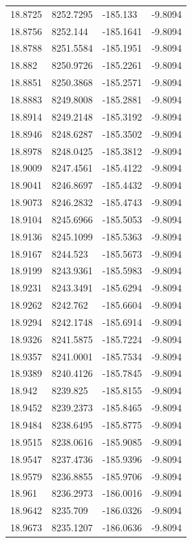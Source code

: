 \begin{table}[H]
\begin{tabular}{llll}
18.8725 & 8252.7295 & -185.133 & -9.8094 \\
18.8756 & 8252.144 & -185.1641 & -9.8094 \\
18.8788 & 8251.5584 & -185.1951 & -9.8094 \\
18.882 & 8250.9726 & -185.2261 & -9.8094 \\
18.8851 & 8250.3868 & -185.2571 & -9.8094 \\
18.8883 & 8249.8008 & -185.2881 & -9.8094 \\
18.8914 & 8249.2148 & -185.3192 & -9.8094 \\
18.8946 & 8248.6287 & -185.3502 & -9.8094 \\
18.8978 & 8248.0425 & -185.3812 & -9.8094 \\
18.9009 & 8247.4561 & -185.4122 & -9.8094 \\
18.9041 & 8246.8697 & -185.4432 & -9.8094 \\
18.9073 & 8246.2832 & -185.4743 & -9.8094 \\
18.9104 & 8245.6966 & -185.5053 & -9.8094 \\
18.9136 & 8245.1099 & -185.5363 & -9.8094 \\
18.9167 & 8244.523 & -185.5673 & -9.8094 \\
18.9199 & 8243.9361 & -185.5983 & -9.8094 \\
18.9231 & 8243.3491 & -185.6294 & -9.8094 \\
18.9262 & 8242.762 & -185.6604 & -9.8094 \\
18.9294 & 8242.1748 & -185.6914 & -9.8094 \\
18.9326 & 8241.5875 & -185.7224 & -9.8094 \\
18.9357 & 8241.0001 & -185.7534 & -9.8094 \\
18.9389 & 8240.4126 & -185.7845 & -9.8094 \\
18.942 & 8239.825 & -185.8155 & -9.8094 \\
18.9452 & 8239.2373 & -185.8465 & -9.8094 \\
18.9484 & 8238.6495 & -185.8775 & -9.8094 \\
18.9515 & 8238.0616 & -185.9085 & -9.8094 \\
18.9547 & 8237.4736 & -185.9396 & -9.8094 \\
18.9579 & 8236.8855 & -185.9706 & -9.8094 \\
18.961 & 8236.2973 & -186.0016 & -9.8094 \\
18.9642 & 8235.709 & -186.0326 & -9.8094 \\
18.9673 & 8235.1207 & -186.0636 & -9.8094 \\

\end{tabular}
\end{table}
